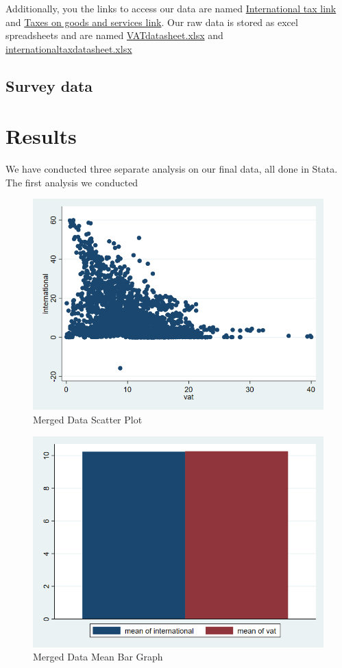 \documentclass[12pt]{article}
\begin{document}
Additionally, you the links to access our data are named \href{https://wits.worldbank.org/CountryProfile/en/Country/BY-COUNTRY/StartYear/1988/EndYear/2022/Indicator/GC-TAX-INTT-RV-ZS}{International tax link} and \href{https://wits.worldbank.org/CountryProfile/en/country/by-country/startyear/LTST/endyear/LTST/indicator/GC-TAX-GSRV-RV-ZS}{Taxes on goods and services link}. Our raw data is stored as excel spreadsheets and are named \href{https://github.com/ecn310/course-project-taxes-tariffs/blob/main/VATdatasheet.xlsx}{VATdatasheet.xlsx} and \href{https://github.com/ecn310/course-project-taxes-tariffs/blob/main/internationaltaxdatasheet.xlsx}{internationaltaxdatasheet.xlsx}

\subsection{Survey data}

\section{Results}
\label{sec:result}

We have conducted three separate analysis on our final data, all done in Stata. The first analysis we conducted 

\begin{figure}
    \centering
    \includegraphics[width=0.5\linewidth]{mergedscatter.png}
    \caption{Merged Data Scatter Plot}
    \label{fig:enter-label}
\end{figure}

\begin{figure}
    \centering
    \includegraphics[width=0.5\linewidth]{mergedbar.png}
    \caption{Merged Data Mean Bar Graph}
    \label{fig:enter-label}
\end{figure}
\end{document}

